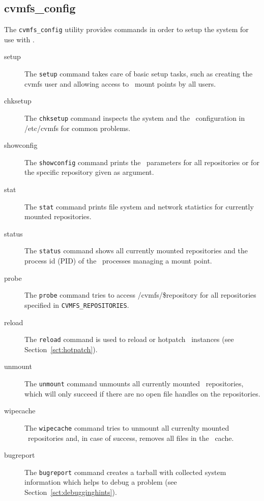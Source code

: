 \subsection{cvmfs\_config}
The \texttt{cvmfs\_config} utility provides commands in order to setup the system for use with \cvmfs.
\begin{description}
	\item[setup] The \texttt{setup} command takes care of basic setup tasks, such as creating the cvmfs user and allowing access to \cvmfs\ mount points by all users.
	\item[chksetup] The \texttt{chksetup} command inspects the system and the \cvmfs\ configuration in /etc/cvmfs for common problems.
	\item [showconfig] The \texttt{showconfig} command prints the \cvmfs\ parameters for all repositories or for the specific repository given as argument.
	\item [stat] The \texttt{stat} command prints file system and network statistics for currently mounted repositories.
	\item [status] The \texttt{status} command shows all currently mounted repositories and the process id (PID) of the \cvmfs\ processes managing a mount point.
	\item [probe] The \texttt{probe} command tries to access /cvmfs/\$repository for all repositories specified in \texttt{CVMFS\_REPOSITORIES}.
	\item [reload] The \texttt{reload} command is used to reload or hotpatch \cvmfs\ instances (see Section~\ref{sct:hotpatch}).
	\item [unmount] The \texttt{unmount} command unmounts all currently mounted \cvmfs\ repositories, which will only succeed if there are no open file handles on the repositories.
	\item [wipecache] The \texttt{wipecache} command tries to unmount all currenlty mounted \cvmfs\ repositories and, in case of success, removes all files in the \cvmfs\ cache.
	\item [bugreport] The \texttt{bugreport} command creates a tarball with collected system information which helps to debug a problem (see Section~\ref{sct:debugginghints}). 
\end{description}

